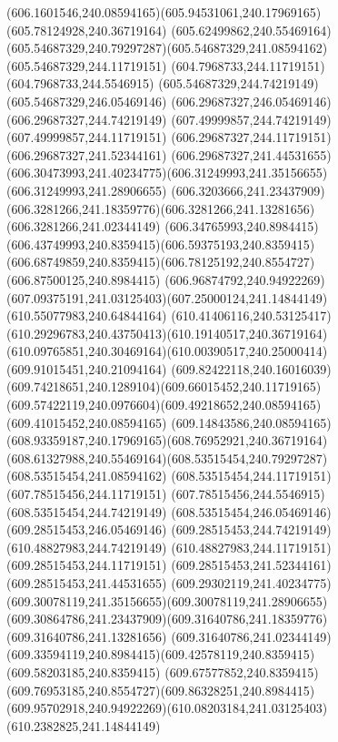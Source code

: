 {{	\curveto(606.1601546,240.08594165)(605.94531061,240.17969165)(605.78124928,240.36719164)
	\curveto(605.62499862,240.55469164)(605.54687329,240.79297287)(605.54687329,241.08594162)
	\lineto(605.54687329,244.11719151)
	\lineto(604.7968733,244.11719151)
	\lineto(604.7968733,244.5546915)
	\lineto(605.54687329,244.74219149)
	\lineto(605.54687329,246.05469146)
	\lineto(606.29687327,246.05469146)
	\lineto(606.29687327,244.74219149)
	\lineto(607.49999857,244.74219149)
	\lineto(607.49999857,244.11719151)
	\lineto(606.29687327,244.11719151)
	\lineto(606.29687327,241.52344161)
	\lineto(606.29687327,241.44531655)
	\curveto(606.30473993,241.40234775)(606.31249993,241.35156655)(606.31249993,241.28906655)
	\curveto(606.3203666,241.23437909)(606.3281266,241.18359776)(606.3281266,241.13281656)
	\lineto(606.3281266,241.02344149)
	\curveto(606.34765993,240.8984415)(606.43749993,240.8359415)(606.59375193,240.8359415)
	\curveto(606.68749859,240.8359415)(606.78125192,240.8554727)(606.87500125,240.8984415)
	\curveto(606.96874792,240.94922269)(607.09375191,241.03125403)(607.25000124,241.14844149)
	\closepath
	\moveto(610.55077983,240.64844164)
	\curveto(610.41406116,240.53125417)(610.29296783,240.43750413)(610.19140517,240.36719164)
	\curveto(610.09765851,240.30469164)(610.00390517,240.25000414)(609.91015451,240.21094164)
	\curveto(609.82422118,240.16016039)(609.74218651,240.1289104)(609.66015452,240.11719165)
	\curveto(609.57422119,240.0976604)(609.49218652,240.08594165)(609.41015452,240.08594165)
	\curveto(609.14843586,240.08594165)(608.93359187,240.17969165)(608.76952921,240.36719164)
	\curveto(608.61327988,240.55469164)(608.53515454,240.79297287)(608.53515454,241.08594162)
	\lineto(608.53515454,244.11719151)
	\lineto(607.78515456,244.11719151)
	\lineto(607.78515456,244.5546915)
	\lineto(608.53515454,244.74219149)
	\lineto(608.53515454,246.05469146)
	\lineto(609.28515453,246.05469146)
	\lineto(609.28515453,244.74219149)
	\lineto(610.48827983,244.74219149)
	\lineto(610.48827983,244.11719151)
	\lineto(609.28515453,244.11719151)
	\lineto(609.28515453,241.52344161)
	\lineto(609.28515453,241.44531655)
	\curveto(609.29302119,241.40234775)(609.30078119,241.35156655)(609.30078119,241.28906655)
	\curveto(609.30864786,241.23437909)(609.31640786,241.18359776)(609.31640786,241.13281656)
	\lineto(609.31640786,241.02344149)
	\curveto(609.33594119,240.8984415)(609.42578119,240.8359415)(609.58203185,240.8359415)
	\curveto(609.67577852,240.8359415)(609.76953185,240.8554727)(609.86328251,240.8984415)
	\curveto(609.95702918,240.94922269)(610.08203184,241.03125403)(610.2382825,241.14844149)
	\closepath
}}

